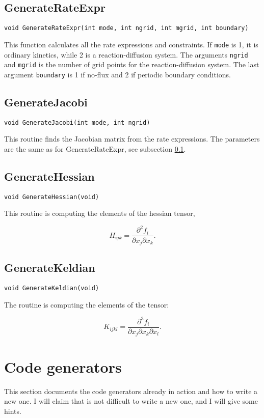 \subsection{GenerateRateExpr}
\label{CodeGen:GenRateExpr}
\begin{verbatim}
void GenerateRateExpr(int mode, int ngrid, int mgrid, int boundary)
\end{verbatim}

This function calculates all the rate expressions and constraints. If
{\tt mode} is 1, it is ordinary kinetics, while 2 is a
reaction-diffusion system. The arguments {\tt ngrid} and {\tt mgrid}
is the number of grid points for the reaction-diffusion system. The
last argument {\tt boundary} is 1 if no-flux and 2 if periodic
boundary conditions.


\subsection{GenerateJacobi}
\begin{verbatim}
void GenerateJacobi(int mode, int ngrid)
\end{verbatim}

This routine finds the Jacobian matrix from the rate expressions. The
parameters are the same as for GenerateRateExpr, see subsection
\ref{CodeGen:GenRateExpr}. 


\subsection{GenerateHessian}
\begin{verbatim}
void GenerateHessian(void)
\end{verbatim}

This routine is computing the elements of the hessian tensor, \ie

\[
  H_{ijk} = \frac{\partial^2 f_i}{\partial x_j \partial x_k}.
\]

\subsection{GenerateKeldian}
\begin{verbatim}
void GenerateKeldian(void)
\end{verbatim}

The routine is computing the elements of the tensor:

\[
  K_{ijkl} = \frac{\partial^3 f_i}{\partial x_j \partial x_k \partial
    x_l}.
\]

\newpage
\section{Code generators}
This section documents the code generators already in action and how
to write a new one. I will claim that is not difficult to write a new
one, and I will give some hints.

